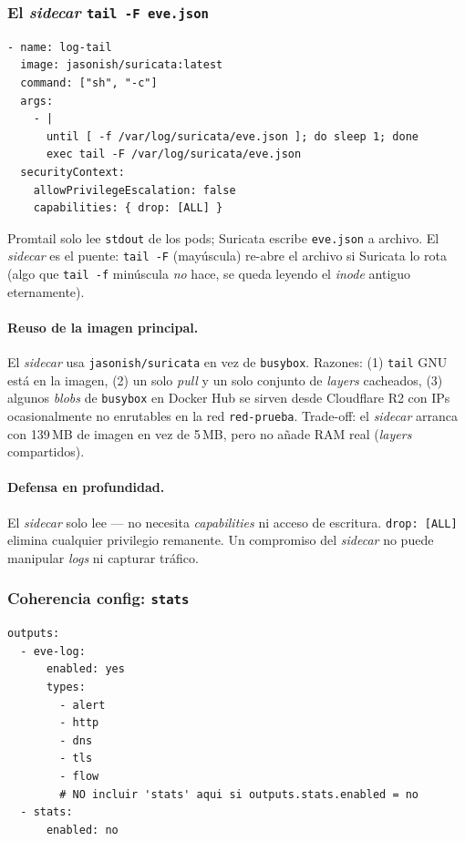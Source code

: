 \subsubsection{El \emph{sidecar} \texttt{tail -F eve.json}}

\begin{lstlisting}[style=yaml]
- name: log-tail
  image: jasonish/suricata:latest
  command: ["sh", "-c"]
  args:
    - |
      until [ -f /var/log/suricata/eve.json ]; do sleep 1; done
      exec tail -F /var/log/suricata/eve.json
  securityContext:
    allowPrivilegeEscalation: false
    capabilities: { drop: [ALL] }
\end{lstlisting}

Promtail solo lee \texttt{stdout} de los pods; Suricata escribe \texttt{eve.json} a archivo. El \emph{sidecar} es el puente: \texttt{tail -F} (mayúscula) re-abre el archivo si Suricata lo rota (algo que \texttt{tail -f} minúscula \emph{no} hace, se queda leyendo el \emph{inode} antiguo eternamente).

\paragraph{Reuso de la imagen principal.} El \emph{sidecar} usa \texttt{jasonish/suricata} en vez de \texttt{busybox}. Razones: (1) \texttt{tail} GNU está en la imagen, (2) un solo \emph{pull} y un solo conjunto de \emph{layers} cacheados, (3) algunos \emph{blobs} de \texttt{busybox} en Docker Hub se sirven desde Cloudflare R2 con IPs ocasionalmente no enrutables en la red \texttt{red-prueba}. Trade-off: el \emph{sidecar} arranca con 139\,MB de imagen en vez de 5\,MB, pero no añade RAM real (\emph{layers} compartidos).

\paragraph{Defensa en profundidad.} El \emph{sidecar} solo lee --- no necesita \emph{capabilities} ni acceso de escritura. \texttt{drop: [ALL]} elimina cualquier privilegio remanente. Un compromiso del \emph{sidecar} no puede manipular \emph{logs} ni capturar tráfico.

\subsubsection{Coherencia config: \texttt{stats}}

\begin{lstlisting}[style=yaml]
outputs:
  - eve-log:
      enabled: yes
      types:
        - alert
        - http
        - dns
        - tls
        - flow
        # NO incluir 'stats' aqui si outputs.stats.enabled = no
  - stats:
      enabled: no
\end{lstlisting}

